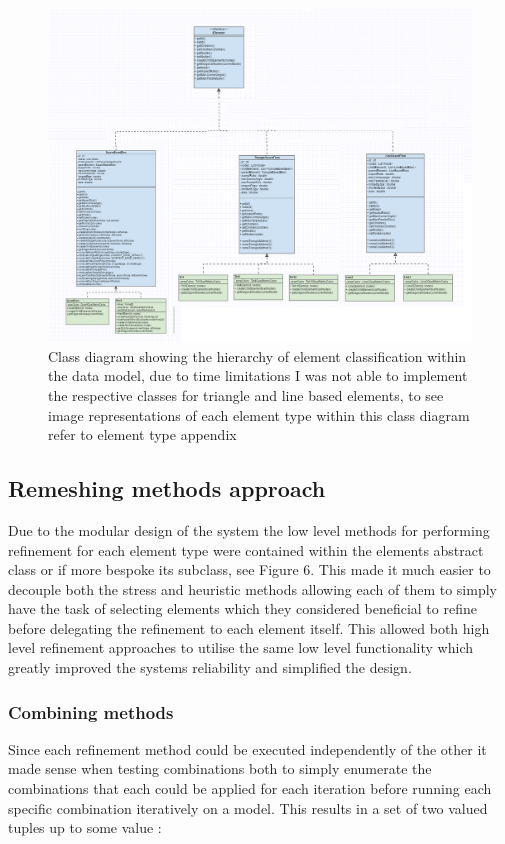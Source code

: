 \begin{figure}[!h]                                                   
  \centerline{\includegraphics[width=150mm, scale=1]{../Graphics/ElementHigerarchyDiagram2.png}}
  \caption{Class diagram showing the hierarchy of element classification within the data model, due to time limitations I was not able to implement the respective classes for triangle and line based elements, to see image representations of each element type within this class diagram refer to element type appendix}
  \label{fig:h-refinementImp}
\end{figure}


\subsection{Remeshing methods approach}
Due to the modular design of the system the low level methods for performing refinement for each element type were contained within the elements abstract class or if more bespoke its subclass, see Figure 6. This made it much easier to decouple both the stress and heuristic methods allowing each of them to simply have the task of selecting elements which they considered beneficial to refine before delegating the refinement to each element itself. This allowed both high level refinement approaches to utilise the same low level functionality which greatly improved the systems reliability and simplified the design.

\subsubsection{Combining methods}
Since each refinement method could be executed independently of the other it made sense when testing combinations both to simply enumerate the combinations that each could be applied for each iteration before running each specific combination iteratively on a model. This results in a set of two valued tuples up to some value :

